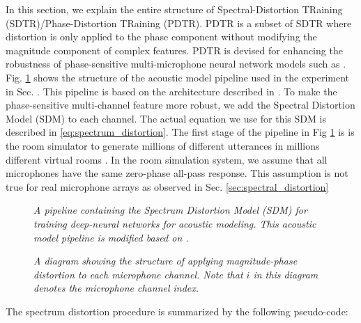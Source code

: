 \documentclass[a4paper]{article}
\begin{document}
In this section, we explain the entire structure of
Spectral-Distortion TRaining (SDTR)/Phase-Distortion TRaining (PDTR).
PDTR is a subset of SDTR where distortion is only
applied to the phase component without modifying the magnitude component
of complex features.
PDTR is devised for enhancing the robustness of phase-sensitive
multi-microphone neural network models such as
\cite{ B_Li_INTERSPEECH_2017_1, T_Sainath_INTERSPEECH_2015_1}.
Fig. \ref{fig:entire_diagram} shows the structure of the acoustic model
pipeline used in the experiment in Sec. \label{sec:experimental_results}.
This pipeline is based on the architecture described in
\cite{T_Sainath_ICASSP_2016_1, B_Li_INTERSPEECH_2017_1}. To make
the phase-sensitive multi-channel feature more robust, we add
the Spectral Distortion Model (SDM) to each channel. The actual equation
we use for this SDM is described in \eqref{eq:spectrum_distortion}.
The first stage of the pipeline in Fig \ref{fig:entire_diagram} is
is the room simulator to  generate millions of different utterances
in millions different virtual rooms \cite{C_Kim_INTERSPEECH_2017_1}.
In the room simulation system, we assume that all microphones
have the same zero-phase all-pass response.
This assumption is not true for real microphone arrays as observed in Sec.
\ref{sec:spectral_distortion}
%
\begin{figure}[t]
  \begin{center}
    \resizebox{50mm}{!}{}
      \caption { \it  A pipeline containing the Spectrum Distortion
      Model (SDM) for training deep-neural networks for acoustic modeling.
     This acoustic model pipeline is modified based on
     \cite{T_Sainath_ICASSP_2016_1}. }
          \label{fig:entire_diagram}
  \end{center}
\end{figure}
%
%
%
\begin{figure}
    \begin{center}
    \resizebox{50mm}{!}
      {}
    \caption {
      \it A diagram showing the structure of applying magnitude-phase
      distortion to each microphone channel. Note that $i$ in this diagram denotes
      the microphone channel index.
      \label{fig:spectrum_distortion_block_diagram}
    }
    \end{center}
\end{figure}
%
%
%
The spectrum distortion procedure is summarized by the following pseudo-code:
\end{document}
